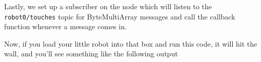 \begin{Shaded}
\begin{Highlighting}[]
 \OperatorTok{*}
\OperatorTok{=}

     \NormalTok{(}
\OperatorTok{=}\NormalTok{, hits[i])[}\NormalTok{]}

        \OperatorTok{!=} \NormalTok{: }
            \NormalTok{(}
    \NormalTok{(}\NormalTok{)}
\end{Highlighting}
\end{Shaded}

Lastly, we set up a subscriber on the node which will listen to the
\texttt{robot0/touches} topic for ByteMultiArray messages and call the
callback function whenever a message comes in.

\begin{Shaded}
\begin{Highlighting}[]
\OperatorTok{=}
\end{Highlighting}
\end{Shaded}

Now, if you load your little robot into that box and run this code, it
will hit the wall, and you'll see something like the following output

\begin{Shaded}
\begin{Highlighting}[]
\OperatorTok{{-}{-}{-}{-}{-}{-}{-}{-}{-}{-}{-}{-}{-}{-}{-}{-}}
\OperatorTok{{-}{-}{-}{-}{-}{-}{-}{-}{-}{-}{-}{-}{-}{-}{-}{-}}
\OperatorTok{{-}{-}{-}{-}{-}{-}{-}{-}{-}{-}{-}{-}{-}{-}{-}{-}}
\end{Highlighting}
\end{Shaded}

